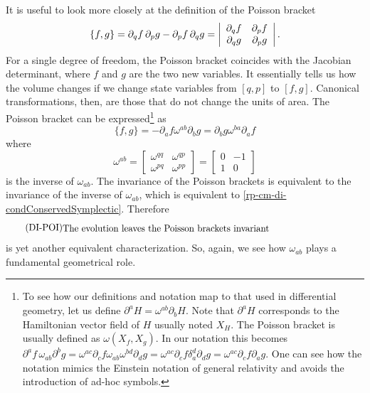 
It is useful to look more closely at the definition of the Poisson bracket
\begin{equation}
	\{f, g\} = \partial_q f \, \partial_p g - \partial_p f \, \partial_q g = \left|\begin{array}{ c c }
		\partial_q f & \partial_p f \\
		\partial_q g & \partial_p g \\
	\end{array} \right|.
\end{equation}
For a single degree of freedom, the Poisson bracket coincides with the Jacobian determinant, where $f$ and $g$ are the two new variables. It essentially tells us how the volume changes if we change state variables from $[q, p]$ to $[f, g]$. Canonical transformations, then, are those that do not change the units of area. The Poisson bracket can be expressed\footnote{To see how our definitions and notation map to that used in differential geometry, let us define $\partial^a H = \omega^{ab} \partial_b H$. Note that $\partial^a H$ corresponds to the Hamiltonian vector field of $H$ usually noted $X_H$. The Poisson bracket is usually defined as $\omega(X_f, X_g)$. In our notation this becomes $\partial^a f \, \omega_{ab} \partial^b g = \omega^{ac} \partial_c f \omega_{ab} \omega^{bd} \partial_d g = \omega^{ac} \partial_c f \delta_a^d \partial_d g = \omega^{ac} \partial_c f \partial_a g$. One can see how the notation mimics the Einstein notation of general relativity and avoids the introduction of ad-hoc symbols.} as
\begin{equation}
	\{f, g\} = - \partial_a f \omega^{ab} \partial_b g = \partial_b g \omega^{ba} \partial_a f
\end{equation}
where 
\begin{equation}
	\omega^{ab} = \left[\begin{array}{cc}
		\omega^{qq} & \omega^{qp} \\
		\omega^{pq} & \omega^{pp} 
	\end{array} \right]= \left[\begin{array}{cc}
		0 & -1 \\
		1 & 0 
	\end{array} \right]
\end{equation}
is the inverse of $\omega_{ab}$. The invariance of the Poisson brackets is equivalent to the invariance of the inverse of $\omega_{ab}$, which is equivalent to \ref{rp-cm-di-condConservedSymplectic}. Therefore
\begin{equation}\label{rp-cm-di-condConservedPoisson}
	\tag{DI-POI}
	\eqtext{The evolution leaves the Poisson brackets invariant}
\end{equation}
is yet another equivalent characterization. So, again, we see how $\omega_{ab}$ plays a fundamental geometrical role.

